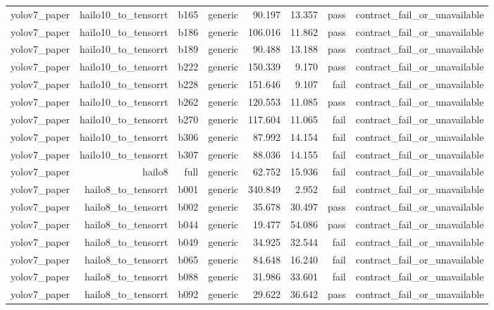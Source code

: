 \begin{table}[t]
\begin{tabular}{lrrrrrrr}
yolov7\_paper & hailo10\_to\_tensorrt & b165 & generic & 90.197 & 13.357 & pass & contract\_fail\_or\_unavailable \\
yolov7\_paper & hailo10\_to\_tensorrt & b186 & generic & 106.016 & 11.862 & pass & contract\_fail\_or\_unavailable \\
yolov7\_paper & hailo10\_to\_tensorrt & b189 & generic & 90.488 & 13.188 & pass & contract\_fail\_or\_unavailable \\
yolov7\_paper & hailo10\_to\_tensorrt & b222 & generic & 150.339 & 9.170 & pass & contract\_fail\_or\_unavailable \\
yolov7\_paper & hailo10\_to\_tensorrt & b228 & generic & 151.646 & 9.107 & fail & contract\_fail\_or\_unavailable \\
yolov7\_paper & hailo10\_to\_tensorrt & b262 & generic & 120.553 & 11.085 & pass & contract\_fail\_or\_unavailable \\
yolov7\_paper & hailo10\_to\_tensorrt & b270 & generic & 117.604 & 11.065 & fail & contract\_fail\_or\_unavailable \\
yolov7\_paper & hailo10\_to\_tensorrt & b306 & generic & 87.992 & 14.154 & fail & contract\_fail\_or\_unavailable \\
yolov7\_paper & hailo10\_to\_tensorrt & b307 & generic & 88.036 & 14.155 & fail & contract\_fail\_or\_unavailable \\
yolov7\_paper & hailo8 & full & generic & 62.752 & 15.936 & fail & contract\_fail\_or\_unavailable \\
yolov7\_paper & hailo8\_to\_tensorrt & b001 & generic & 340.849 & 2.952 & fail & contract\_fail\_or\_unavailable \\
yolov7\_paper & hailo8\_to\_tensorrt & b002 & generic & 35.678 & 30.497 & pass & contract\_fail\_or\_unavailable \\
yolov7\_paper & hailo8\_to\_tensorrt & b044 & generic & 19.477 & 54.086 & pass & contract\_fail\_or\_unavailable \\
yolov7\_paper & hailo8\_to\_tensorrt & b049 & generic & 34.925 & 32.544 & fail & contract\_fail\_or\_unavailable \\
yolov7\_paper & hailo8\_to\_tensorrt & b065 & generic & 84.648 & 16.240 & fail & contract\_fail\_or\_unavailable \\
yolov7\_paper & hailo8\_to\_tensorrt & b088 & generic & 31.986 & 33.601 & fail & contract\_fail\_or\_unavailable \\
yolov7\_paper & hailo8\_to\_tensorrt & b092 & generic & 29.622 & 36.642 & pass & contract\_fail\_or\_unavailable \\

\end{tabular}
\end{table}
